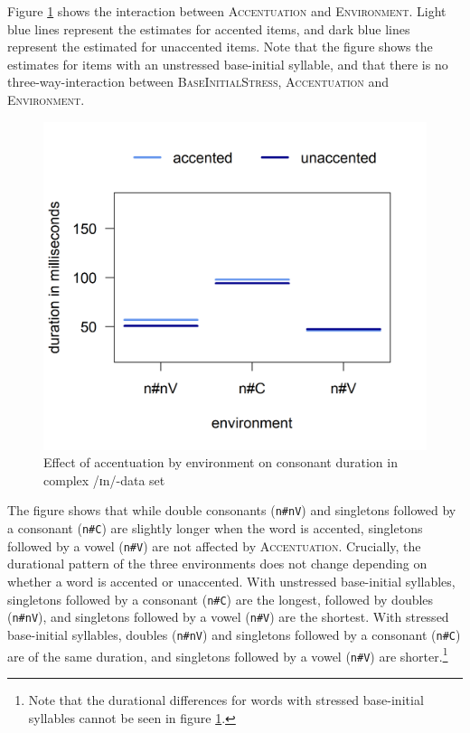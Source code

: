  	
 

Figure \ref{fig:Env Acc In experiment} shows the interaction between \textsc{Accentuation} and \textsc{Environment}. Light blue lines represent the estimates for accented items, and dark blue lines represent the estimated for unaccented items. Note that the figure shows the estimates for items with an unstressed base-initial syllable, and that there is no three-way-interaction between \textsc{BaseInitialStress}, \textsc{Accentuation} and \textsc{Environment}. 


	


	\begin{figure}[h!]
		\centering
		\includegraphics [scale=0.5] {images/Experiment/InModelInterEnvAcc}
		\caption{Effect of accentuation by environment on consonant duration in complex /ɪn/-data set}
		\label{fig:Env Acc In experiment}
	\end{figure}






The figure shows that while double consonants (\texttt{n\#nV}) and singletons followed by a consonant (\texttt{n\#C}) are slightly longer when the word is accented, singletons followed by a vowel (\texttt{n\#V}) are not affected by \textsc{Accentuation}. Crucially, 
the durational pattern of the three environments does not change depending on whether a word is accented or unaccented. 
With unstressed base-initial syllables, singletons followed by a consonant (\texttt{n\#C}) are the longest, followed by doubles (\texttt{n\#nV}), and singletons followed by a vowel (\texttt{n\#V}) are the shortest.
With stressed base-initial syllables, doubles (\texttt{n\#nV}) and singletons followed by a consonant (\texttt{n\#C}) are of the same duration, and singletons followed by a vowel (\texttt{n\#V}) are shorter.\footnote{Note that the durational differences for words with stressed base-initial syllables cannot be seen in figure \ref{fig:Env Acc In experiment}.}


